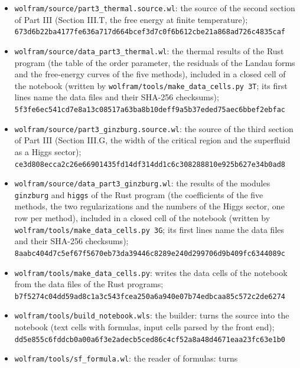 \documentclass[
  10pt,
]{article}
\begin{document}
\begin{itemize}
  \texttt{8a124c8a2cf1382aa9189b5c2a8d210735cc3aeb19d22afb0bece0d3e184116a}
\item
  \texttt{wolfram/source/part3\_thermal.source.wl}: the source of the
  second section of Part III (Section III.T, the free energy at finite
  temperature);\\
  \texttt{673d6b22ba4177fe636a717d664bcef3d7c0f6b612cbe21a868ad726c4835caf}
\item
  \texttt{wolfram/source/data\_part3\_thermal.wl}: the thermal results
  of the Rust program (the table of the order parameter, the residuals
  of the Landau forms and the free-energy curves of the five methods),
  included in a closed cell of the notebook (written by
  \texttt{wolfram/tools/make\_data\_cells.py\ 3T}; its first lines name
  the data files and their SHA-256 checksums);\\
  \texttt{5f3fe6ec541cd7e8a13c08517a63ba8b10deff9a5b37eded75aec6bbef2ebfac}
\item
  \texttt{wolfram/source/part3\_ginzburg.source.wl}: the source of the
  third section of Part III (Section III.G, the width of the critical
  region and the superfluid as a Higgs sector);\\
  \texttt{ce3d808ecca2c26e66901435fd14df314dd1c6c308288810e925b627e34b0ad8}
\item
  \texttt{wolfram/source/data\_part3\_ginzburg.wl}: the results of the
  modules \texttt{ginzburg} and \texttt{higgs} of the Rust program (the
  coefficients of the five methods, the two regularizations and the
  numbers of the Higgs sector, one row per method), included in a closed
  cell of the notebook (written by
  \texttt{wolfram/tools/make\_data\_cells.py\ 3G}; its first lines name
  the data files and their SHA-256 checksums);\\
  \texttt{8aabc404d7c5ef67f5670eb73da39446c8289e240d299706d9b409fc6344089c}
\item
  \texttt{wolfram/tools/make\_data\_cells.py}: writes the data cells of
  the notebook from the data files of the Rust programs;\\
  \texttt{b7f5274c04dd59ad8c1a3c543fcea250a6a940e07b74edbcaa85c572c2de6274}
\item
  \texttt{wolfram/tools/build\_notebook.wls}: the builder: turns the
  source into the notebook (text cells with formulas, input cells parsed
  by the front end);\\
  \texttt{dd5e855c6fddcb0a00a6f3e2adecb5ced86c4cf52a8a48d4671eaa23fc63e1b0}
\item
  \texttt{wolfram/tools/sf\_formula.wl}: the reader of formulas: turns

\end{itemize}
\end{document}
